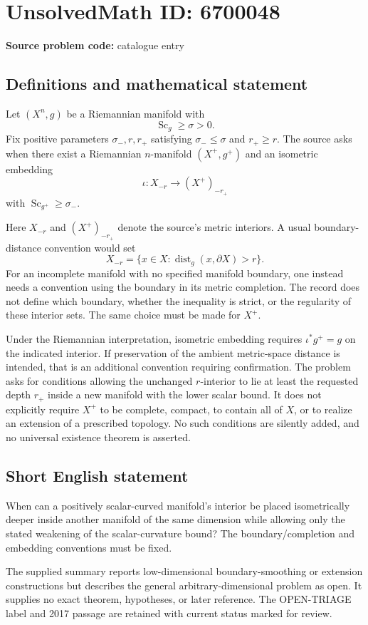 \documentclass[11pt]{article}
\begin{document}
\section*{UnsolvedMath ID: 6700048}
\textbf{Source problem code:} catalogue entry
\subsection{Definitions and mathematical statement}
Let $(X^n,g)$ be a Riemannian manifold with
\[
 \operatorname{Sc}_g\ge\sigma>0.
\]
Fix positive parameters $\sigma_-,r,r_+$ satisfying $\sigma_-\le\sigma$ and $r_+\ge r$. The source asks when there exist a Riemannian $n$-manifold $(X^+,g^+)$ and an isometric embedding
\[
 \iota:X_{-r}\longrightarrow (X^+)_{-r_+}
\]
with $\operatorname{Sc}_{g^+}\ge\sigma_-$.

Here $X_{-r}$ and $(X^+)_{-r_+}$ denote the source's metric interiors. A usual boundary-distance convention would set
\[
 X_{-r}=\{x\in X:\operatorname{dist}_g(x,\partial X)>r\}.
\]
For an incomplete manifold with no specified manifold boundary, one instead needs a convention using the boundary in its metric completion. The record does not define which boundary, whether the inequality is strict, or the regularity of these interior sets. The same choice must be made for $X^+$.

Under the Riemannian interpretation, isometric embedding requires $\iota^*g^+=g$ on the indicated interior. If preservation of the ambient metric-space distance is intended, that is an additional convention requiring confirmation. The problem asks for conditions allowing the unchanged $r$-interior to lie at least the requested depth $r_+$ inside a new manifold with the lower scalar bound. It does not explicitly require $X^+$ to be complete, compact, to contain all of $X$, or to realize an extension of a prescribed topology. No such conditions are silently added, and no universal existence theorem is asserted.
\subsection{Short English statement}
When can a positively scalar-curved manifold's interior be placed isometrically deeper inside another manifold of the same dimension while allowing only the stated weakening of the scalar-curvature bound? The boundary/completion and embedding conventions must be fixed.

The supplied summary reports low-dimensional boundary-smoothing or extension constructions but describes the general arbitrary-dimensional problem as open. It supplies no exact theorem, hypotheses, or later reference. The OPEN-TRIAGE label and 2017 passage are retained with current status marked for review.
\end{document}
